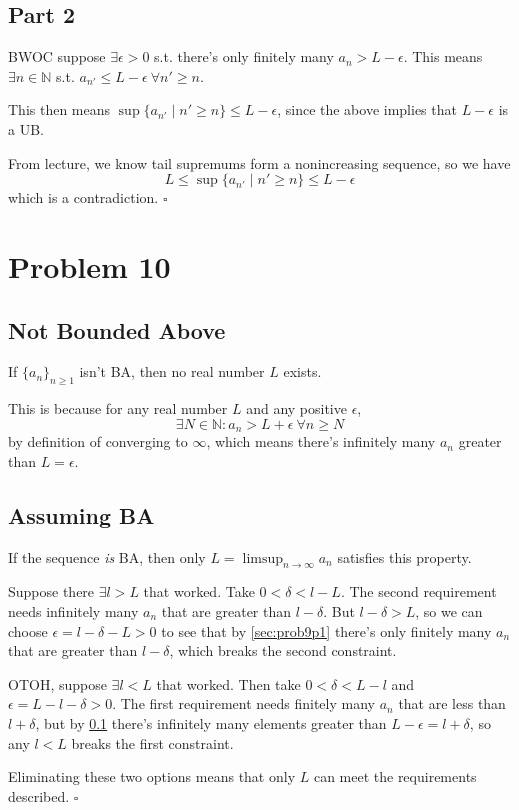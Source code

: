 \documentclass[12pt]{article}
\newcommand{\N}{\mathbb{N}}
\begin{document}
\subsection{Part 2}\label{sec:prob9p2}

BWOC suppose $\exists \epsilon > 0$ s.t. there's only finitely many $a_n > L-\epsilon$.
This means $\exists n \in \N$ s.t. $a_{n'} \le L-\epsilon\ \forall n' \ge n$.

This then means $\sup \{a_{n'} \mid n' \ge n\} \le L-\epsilon$,
since the above implies that $L-\epsilon$ is a UB.

From lecture, we know tail supremums form a nonincreasing sequence, so we have
\[L \le \sup \{a_{n'} \mid n' \ge n\} \le L-\epsilon\]
which is a contradiction. $\square$

\pagebreak

\section{Problem 10}

\subsection{Not Bounded Above}

If $\{a_n\}_{n \ge 1}$ isn't BA, then no real number $L$ exists.

This is because for any real number $L$ and any positive $\epsilon$,
\[\exists N \in \N: a_n > L+\epsilon\ \forall n \ge N\]
by definition of converging to $\infty$, which means there's infinitely many $a_n$ greater than $L=\epsilon$.

\subsection{Assuming BA}

If the sequence \textit{is} BA, then only $L=\limsup_{n \to \infty} a_n$ satisfies this property.

Suppose there $\exists l > L$ that worked.
Take $0 < \delta < l-L$.
The second requirement needs infinitely many $a_n$ that are greater than $l-\delta$.
But $l-\delta > L$, so we can choose $\epsilon=l-\delta-L > 0$
to see that by \ref{sec:prob9p1} there's only finitely many $a_n$ that are greater than $l-\delta$,
which breaks the second constraint.

OTOH, suppose $\exists l < L$ that worked.
Then take $0 < \delta < L-l$ and $\epsilon = L-l-\delta > 0$.
The first requirement needs finitely many $a_n$ that are less than $l+\delta$,
but by \ref{sec:prob9p2} there's infinitely many elements greater than $L-\epsilon = l+\delta$,
so any $l < L$ breaks the first constraint.

Eliminating these two options means that only $L$ can meet the requirements described. $\square$
\end{document}
